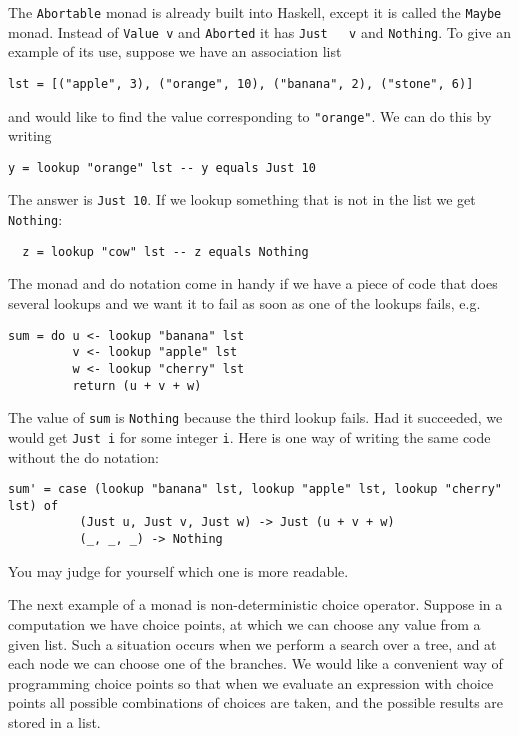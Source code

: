 \documentclass[a4paper,10pt]{article}
\newcommand{\cc}[1]{\lstinline{#1}}
\begin{document}
The \cc{Abortable} monad is already built into Haskell, except it is called
the \cc{Maybe} monad. Instead of \cc{Value v} and \cc{Aborted} it has \cc{Just
  v} and \cc{Nothing}. To give an example of its use, suppose we have an
association list
% 
\begin{lstlisting}
lst = [("apple", 3), ("orange", 10), ("banana", 2), ("stone", 6)]
\end{lstlisting}
% 
and would like to find the value corresponding to \cc{"orange"}. We can do
this by writing
% 
\begin{lstlisting}
y = lookup "orange" lst -- y equals Just 10
\end{lstlisting}
% 
The answer is \cc{Just 10}. If we lookup something that is not in the list we
get \cc{Nothing}:
% 
\begin{lstlisting}
  z = lookup "cow" lst -- z equals Nothing
\end{lstlisting}
% 
The monad and do notation come in handy if we have a piece of code that does
several lookups and we want it to fail as soon as one of the lookups fails,
e.g.
% 
\begin{lstlisting}
sum = do u <- lookup "banana" lst
         v <- lookup "apple" lst
         w <- lookup "cherry" lst
         return (u + v + w)
\end{lstlisting}
% 
The value of \cc{sum} is \cc{Nothing} because the third lookup fails. Had it
succeeded, we would get \cc{Just i} for some integer \cc{i}. Here is one way
of writing the same code without the do notation:
% 
\begin{lstlisting}
sum' = case (lookup "banana" lst, lookup "apple" lst, lookup "cherry" lst) of
          (Just u, Just v, Just w) -> Just (u + v + w)
          (_, _, _) -> Nothing
\end{lstlisting}
% 
You may judge for yourself which one is more readable.

The next example of a monad is non-deterministic choice operator. Suppose in a
computation we have choice points, at which we can choose any value from a
given list. Such a situation occurs when we perform a search over a tree, and
at each node we can choose one of the branches. We would like a convenient way
of programming choice points so that when we evaluate an expression with
choice points all possible combinations of choices are taken, and the possible
results are stored in a list.
\end{document}
